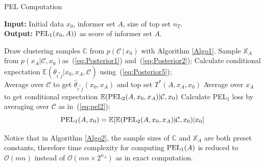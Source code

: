 \documentclass[12pt]{article}
\begin{document}
\begin{algorithm}
\caption{PEL Computation}\label{Algo2}
\hspace*{\algorithmicindent} \textbf{Input:} Initial data $x_0$, informer set $A$, size of top set $n_T$.\\
\hspace*{\algorithmicindent} \textbf{Output:} ${\rm PEL}_1(x_0,A))$ as score of informer set $A$. 
\begin{algorithmic}[1]
\State Draw clustering samples $\mathbb{C}$ from $p(\mathcal{C}\,|\,x_0)$ with Algorithm \ref{Algo1}.
        \State Sample $\mathbb X_A$ from $p(x_A|\mathcal{C},x_0)$as~(\ref{eq:Posterior1}) and~(\ref{eq:Posterior2}); 
    	    \State Calculate conditional expectation 
    	    $\mathbb E(\theta_{i^*j}|x_0,x_A,\mathcal{C})$ using~(\ref{eq:Posterior5});\\
    	    \State Average over $\mathcal C$ to get $\hat \theta_{i^*j}(x_0,x_A)$ and top set $T^*(A,x_A,x_0)$
		\EndFor
	    \State Average over $x_A$ to get conditional expectation $\mathbb E({\rm PEL}_2(A,x_0,x_A)|\mathcal{C},x_0)$
	\EndFor
	\State Calculate PEL$_1$ loss by averaging over $\mathcal C$ as in~(\ref{eq:pel2}):
	\begin{equation*}
	    {\rm PEL}_1(A,x_0) =\mathbb E[\mathbb E({\rm PEL}_2(A,x_0,x_A)|\mathcal{C},x_0)|x_0]
	\end{equation*}
\end{algorithmic}
\end{algorithm}
Notice that in Algorithm \ref{Algo2}, the sample sizes of $\mathbb C$ and $\mathbb{X}_A$ are both preset constants, therefore time complexity for computing ${\rm PEL}_1(A)$ is reduced to $\mathcal{O}(mn)$ instead of $\mathcal{O}(mn\times 2^{n_A})$ as in exact computation. 
\end{document}
